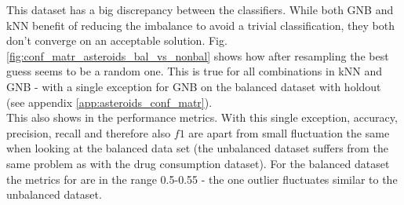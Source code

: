 \documentclass{article}
\begin{document}
This dataset has a big discrepancy between the classifiers. While both GNB and kNN benefit of reducing the imbalance to avoid a trivial classification, they both don't converge on an acceptable solution. Fig.\ref{fig:conf_matr_asteroids_bal_vs_nonbal} shows how after resampling the best guess seems to be a random one. This is true for all combinations in kNN and GNB - with a single exception for GNB on the balanced dataset with holdout (see appendix \ref{app:asteroids_conf_matr}). \\
This also shows in the performance metrics. With this single exception, accuracy, precision, recall and therefore also $f1$ are apart from small fluctuation the same when looking at the balanced data set (the unbalanced dataset suffers from the same problem as with the drug consumption dataset). For the balanced dataset the metrics for are in the range 0.5-0.55 - the one outlier fluctuates similar to the unbalanced dataset.
\end{document}
